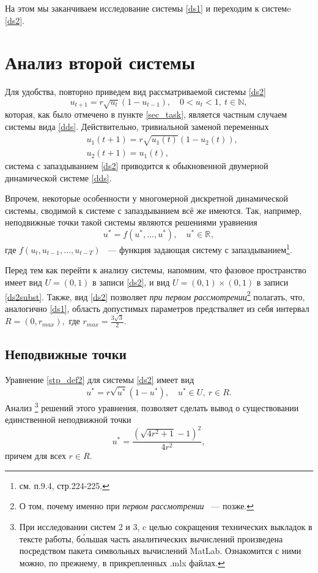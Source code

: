 \documentclass[oneside,final,12pt]{article}
\newcommand*\Rn  [1]{\mathbb{R}^{#1}}
\newcommand*\Na {\mathbb{N}}
\newcommand*\inter[2]{(#1,#2)}
\theoremstyle{plain}
\theoremstyle{remark}
\theoremstyle{definition}
\theoremstyle{plain}
\begin{document}
	На этом мы заканчиваем исследование системы \eqref{ds1} и переходим к системe \eqref{ds2}.

 	\section{Анализ второй системы}
		Для удобства, повторно приведем вид рассматриваемой системы \eqref{ds2} 
			\[u_{t+1} = r \sqrt{u_t} (1-u_{t-1}), \quad 0 < u_t < 1, \: t \in \Na,\]
которая, как было отмечено в пункте \ref{sec_task}, является частным случаем системы вида \eqref{dds}. Действительно, тривиальной заменой переменных
			\begin{equation}\label{ds2subst}\begin{aligned}
				&u_1(t+1) = r \sqrt{u_1(t)} (1-u_2(t)),\\
				&u_2(t+1) = u_1(t),
			\end{aligned}\end{equation}
система с запаздыванием \eqref{ds2} приводится к обыкновенной двумерной динамической системе \eqref{dds}.

		Впрочем, некоторые особенности у многомерной дискретной динамической системы, сводимой к системе с запаздыванием всё же имеются. Так, например, неподвижные точки такой системы являются решениями уравнения
		\begin{equation}\label{stp_def2}
			u^* = f(u^*,\ldots,u^*), \quad u^* \in \Rn{},
		\end{equation}
где \(f(u_t, u_{t-1}, \ldots, u_{t-T})\) ~--- функция задающая систему с запаздыванием\footnote{см. \cite{DSMB} п.9.4, стр.224-225.}.
		
	Перед тем как перейти к анализу системы, напомним, что фазовое пространство имеет вид \(U = \inter{0}{1}\) в записи \eqref{ds2}, и вид \(U = \inter{0}{1} \times \inter{0}{1}\) в записи \eqref{ds2subst}. Также, вид \eqref{ds2} позволяет \emph{при первом рассмотрении}\footnote{О том, почему именно при \emph{первом рассмотрении} ~--- позже.} полагать, что, аналогично \eqref{ds1}, область допустимых параметров предстваляет из себя интервал \(R = \left(0,r_{max}\right), \text{ где } r_{max} = \frac{3\sqrt{3}}{2}\).

	\subsection{Неподвижные точки}\label{section_stp}
		Уравнение \eqref{stp_def2} для системы \eqref{ds2} имеет вид
			\[u^* = r \sqrt{u^*} (1-u^*), \quad u^* \in U,\: r \in R.\]
		Анализ \footnote{При исследовании систем 2 и 3, c целью сокращения технических выкладок в тексте работы, б\'{о}льшая часть аналитических вычислений произведена посредством пакета символьных вычислений MatLab. Ознакомится с ними можно, по прежнему, в прикрепленных .mlx файлах.} решений этого уравнения, позволяет сделать вывод о существовании единственной неподвижной точки 
		\begin{equation}\label{stp_ds2}
			u^* = \frac{(\sqrt{4r^2+1}-1)^2}{4r^2},
		\end{equation}
причем для всех \(r \in R\).
\end{document}
